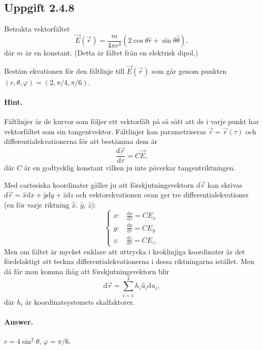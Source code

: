 \documentclass[%
oneside,                 %
final,                   %
10pt]{article}
\newenvironment{doconceexercise}{}{}
\newcounter{doconceexercisecounter}
\begin{document}
\begin{doconceexercise}

\subsection{Uppgift 2.4.8}

Betrakta vektorfältet
$$
\vec E(\vec{r}) = \frac{m}{4\pi r^3} (2\cos \theta \hat{r} + \sin\theta \hat{\theta}),
$$
där $m$ är en konstant. (Detta är fältet från en elektrisk dipol.)

Bestäm ekvationen för den fältlinje till $\vec E(\vec{r})$ som går genom punkten $(r, \theta, \varphi) = (2, \pi /4, \pi /6)$.


\paragraph{Hint.}
Fältlinjer är de kurvor som följer ett vektorfält på så sätt att de i varje punkt har vektorfältet som sin tangentvektor. Fältlinjer kan parametriseras $\vec{r} = \vec{r}(\tau)$ och differentialekvationerna för att bestämma dem är
$$
\frac{\mbox{d}\vec{r}}{\mbox{d}\tau} = C \vec{E},
$$
där $C$ är en godtycklig konstant vilken ju inte påverkar tangentriktningen.

Med cartesiska koordinater gäller ju att förskjutningsvektorn $\mbox{d}\vec{r}$ kan skrivas $\mbox{d}\vec{r} = \hat{x} \mbox{d}x + \hat{y} \mbox{d}y + \hat{z} \mbox{d}z$ och vektorekvationen ovan ger tre differentialekvationer (en för varje riktning $\hat{x}$, $\hat{y}$, $\hat{z}$):
$$
\left\{
\begin{array}{ll}
x: &
\frac{\mbox{d}x}{\mbox{d}\tau} = C E_x \\
y: &
\frac{\mbox{d}y}{\mbox{d}\tau} = C E_y \\
z: &
\frac{\mbox{d}z}{\mbox{d}\tau} = C E_z.
\end{array}
\right.
$$
Men om fältet är mycket enklare att uttrycka i kroklinjiga koordinater är det fördelaktigt att teckna differentialekvationerna i dessa riktningarna istället. Men då får man komma ihåg att förskjutningsvektorn blir
$$
\mbox{d}\vec{r} = \sum_{i=1}^3 h_i \hat{u}_i \mbox{d}u_i,
$$
där $h_i$ är koordinatsystemets skalfaktorer.



\paragraph{Answer.}
$r = 4 \sin^2 \theta$, $\varphi = \pi/6$.


\end{doconceexercise}
\end{document}

